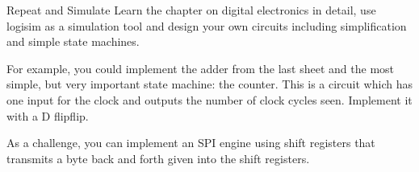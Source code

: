 \documentclass[twoside]{article}
\begin{document}
\maketitle

\begin{task}{Repeat and Simulate}{}{}
  Learn the chapter on digital electronics in detail, use logisim as a simulation tool and
  design your own circuits including simplification and simple state machines.

  For example, you could implement the adder from the last sheet and the most simple, but very important state machine: the counter. This is a circuit which has one input for the clock and outputs the number of clock cycles seen. Implement it with a D flipflip.

  As a challenge, you can implement an SPI engine using shift registers that transmits a byte back and forth given into the shift registers.
\end{task}
\end{document}
